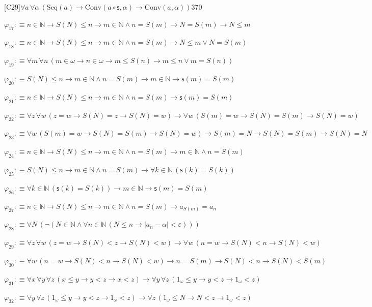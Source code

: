 \begin{fullproof}{[C29]}{$\forall a\,\forall \alpha\,(\mathrm{Seq}(a) \to \mathrm{Conv}(a \circ \mathsf{s},\alpha) \to \mathrm{Conv}(a,\alpha))$}{370}
\begin{abbrevlist}
\item $\varphi_{17} :\equiv n \in \mathbb{N} \to S(N) \leq n \to m \in \mathbb{N} \land n = S(m) \to N = S(m) \to N \leq m$
\item $\varphi_{18} :\equiv n \in \mathbb{N} \to S(N) \leq n \to m \in \mathbb{N} \land n = S(m) \to N \leq m \lor N = S(m)$
\item $\varphi_{19} :\equiv \forall m\,\forall n\,(m \in \omega \to n \in \omega \to m \leq S(n) \to m \leq n \lor m = S(n))$
\item $\varphi_{20} :\equiv S(N) \leq n \to m \in \mathbb{N} \land n = S(m) \to m \in \mathbb{N} \to \mathsf{s}(m) = S(m)$
\item $\varphi_{21} :\equiv n \in \mathbb{N} \to S(N) \leq n \to m \in \mathbb{N} \land n = S(m) \to \mathsf{s}(m) = S(m)$
\item $\varphi_{22} :\equiv \forall z\,\forall w\,(z = w \to S(N) = z \to S(N) = w) \to \forall w\,(S(m) = w \to S(N) = S(m) \to S(N) = w)$
\item $\varphi_{23} :\equiv \forall w\,(S(m) = w \to S(N) = S(m) \to S(N) = w) \to S(m) = N \to S(N) = S(m) \to S(N) = N$
\item $\varphi_{24} :\equiv n \in \mathbb{N} \to S(N) \leq n \to m \in \mathbb{N} \land n = S(m) \to m \in \mathbb{N} \land n = S(m)$
\item $\varphi_{25} :\equiv S(N) \leq n \to m \in \mathbb{N} \land n = S(m) \to \forall k \in \mathbb{N}\,(\mathsf{s}(k) = S(k))$
\item $\varphi_{26} :\equiv \forall k \in \mathbb{N}\,(\mathsf{s}(k) = S(k)) \to m \in \mathbb{N} \to \mathsf{s}(m) = S(m)$
\item $\varphi_{27} :\equiv n \in \mathbb{N} \to S(N) \leq n \to m \in \mathbb{N} \land n = S(m) \to a_{S(m)} = a_{n}$
\item $\varphi_{28} :\equiv \forall N\,(\neg (N \in \mathbb{N} \land \forall n \in \mathbb{N}\,(N \leq n \to \lvert a_{n} - \alpha \rvert < \varepsilon)))$
\item $\varphi_{29} :\equiv \forall z\,\forall w\,(z = w \to S(N) < z \to S(N) < w) \to \forall w\,(n = w \to S(N) < n \to S(N) < w)$
\item $\varphi_{30} :\equiv \forall w\,(n = w \to S(N) < n \to S(N) < w) \to n = S(m) \to S(N) < n \to S(N) < S(m)$
\item $\varphi_{31} :\equiv \forall x\,\forall y\,\forall z\,(x \leq y \to y < z \to x < z) \to \forall y\,\forall z\,(1_{\omega} \leq y \to y < z \to 1_{\omega} < z)$
\item $\varphi_{32} :\equiv \forall y\,\forall z\,(1_{\omega} \leq y \to y < z \to 1_{\omega} < z) \to \forall z\,(1_{\omega} \leq N \to N < z \to 1_{\omega} < z)$

\end{abbrevlist}
\end{fullproof}
